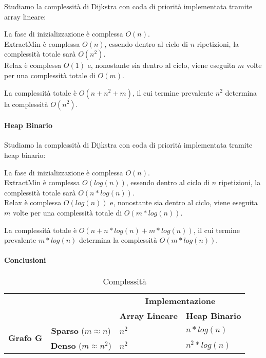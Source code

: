 {Studiamo la complessità di Dijkstra con coda di priorità implementata tramite array lineare:}

La fase di inizializzazione è complessa $O(n)$. \\
ExtractMin è complessa $O(n)$, essendo dentro al ciclo di $n$ ripetizioni, la complessità totale sarà $O(n^2)$. \\
Relax è complessa $O(1)$ e, nonostante sia dentro al ciclo, viene eseguita $m$ volte per una complessità totale di $O(m)$.

La complessità totale è $O(n+n^2+m)$, il cui termine prevalente $n^2$ determina la complessità $O(n^2)$.

\paragraph{Heap Binario}

{Studiamo la complessità di Dijkstra con coda di priorità implementata tramite heap binario:}

La fase di inizializzazione è complessa $O(n)$. \\
ExtractMin è complessa $O(log(n))$, essendo dentro al ciclo di $n$ ripetizioni, la complessità totale sarà $O(n*log(n))$. \\
Relax è complessa $O(log(n))$ e, nonostante sia dentro al ciclo, viene eseguita $m$ volte per una complessità totale di $O(m*log(n))$.

La complessità totale è $O(n+n*log(n)+m*log(n))$, il cui termine prevalente $m*log(n)$ determina la complessità $O(m*log(n))$.

\paragraph{Conclusioni}

\begin{table}[h]
\centering
\caption{Complessità}
\begin{tabular}{ll|l|l|}
\cline{3-4}
                                                        &                                      & \multicolumn{2}{c|}{\textbf{Implementazione}}                                            \\ \cline{3-4}
                                                        &                                      & \multicolumn{1}{c|}{\textbf{Array Lineare}} & \multicolumn{1}{c|}{\textbf{Heap Binario}} \\ \hline
\multicolumn{1}{|c|}{\multirow{2}{*}{\textbf{Grafo G}}} & \multicolumn{1}{c|}{\textbf{Sparso} ($m \approx n$)} & $n^2$                                         & $n*log(n)$                                        \\ \cline{2-4}
\multicolumn{1}{|c|}{}                                  & \multicolumn{1}{c|}{\textbf{Denso}  ($m \approx n^2$)}  & $n^2$                                         & $n^2*log(n)$                                                                               \\ \hline
\end{tabular}
\end{table}

